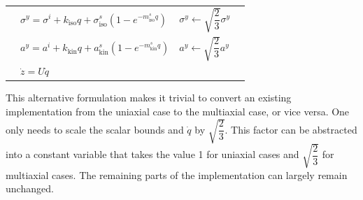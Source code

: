 \begin{table}[htb]
\begin{tabular}{rlll}
                           & $\sigma^y=\sigma^i+k_\text{iso}q+\sigma^s_\text{iso}\left(1-e^{-m^s_\text{iso}q}\right)$ & $\sigma^y\leftarrow\sqrt{\dfrac{2}{3}}\sigma^y$               &              \\
                           & $a^y=a^i+k_\text{kin}q+a^s_\text{kin}\left(1-e^{-m^s_\text{kin}q}\right)$                & $a^y\leftarrow\sqrt{\dfrac{2}{3}}a^y$                         &              \\                           & \multicolumn{2}{l}{$\dot{z}=U\dot{q}$}                                                   &                                                                              \\ \bottomrule
    \end{tabular}
\end{table}
This alternative formulation makes it trivial to convert an existing implementation from the uniaxial case to the multiaxial case, or vice versa.
One only needs to scale the scalar bounds and $\dot{q}$ by $\sqrt{\dfrac{2}{3}}$.
This factor can be abstracted into a constant variable that takes the value \num{1} for uniaxial cases and $\sqrt{\dfrac{2}{3}}$ for multiaxial cases.
The remaining parts of the implementation can largely remain unchanged.
